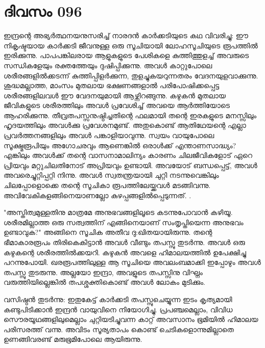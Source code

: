  
\section{ദിവസം 096}


ഇന്ദ്രന്റെ അഭ്യര്‍ത്ഥനയനുസരിച്ച്‌ നാരദന്‍ കാര്‍ക്കടിയുടെ കഥ വിവരിച്ചു: ഈ നികൃഷ്ടയായ കാര്‍ക്കടി ജീവനുള്ള ഒരു സൂചിയായി ലോഹസൂചിയുടെ രൂപത്തില്‍ ഇരിക്കുന്നു. പാപപങ്കിലരായ ആളുകളുടെ പേശികളെ കുത്തിത്തുളച്ച്‌ അവരുടെ സന്ധികളേയും രക്തത്തേയും ദുഷിപ്പിക്കുന്നു. അവള്‍ കാറ്റുപോലെ ശരീരങ്ങളില്‍ക്കടന്ന് കുത്തിപ്പിളര്‍ക്കുന്ന, തുളച്ചുകയറുന്നതരം വേദനയുളവാക്കുന്നു. ശുദ്ധമല്ലാത്ത, മാംസം മുതലായ ഭക്ഷണങ്ങളാല്‍ പരിപോഷിക്കപ്പെട്ട ശരീരങ്ങളിലവള്‍ ഈ വേദനയുമായി ആഴ്ന്നിറങ്ങുന്നു. കഴുകന്‍ മുതലായ ജീവികളുടെ ശരീരത്തിലും അവള്‍ പ്രവേശിച്ച്‌ അവയെ ആര്‍ത്തിയോടെ ആഹരിക്കുന്നു. തീവ്രതപസ്സനുഷ്ഠിച്ചതിന്റെ ഫലമായി തന്റെ ഇരകളുടെ മനസ്സിലും ഹൃദയത്തിലും അവള്‍ക്കു പ്രവേശനമുണ്ട്‌. അതുകൊണ്ട്‌ ആതിഥേയന്റെ എല്ലാ പ്രവര്‍ത്തനങ്ങളിലും അവള്‍ പങ്കാളിയാവുന്നു. സ്വയം വായുപോലെ സൂക്ഷ്മരൂപിയും അഗോചരവും ആണെങ്കില്‍ ഒരാള്‍ക്ക്‌ എന്താണസാദ്ധ്യം? എങ്കിലും അവള്‍ക്ക്‌ തന്റെ വാസനാമാലിന്യം കാരണം ചിലജീവികളോട്‌ ഏറെ പ്രിയവും മറ്റുചിലതിനോട്‌ അപ്രിയവും ഉണ്ടായി. അവയോട്‌ ബന്ധപ്പെട്ട്‌, അവള്‍ അവരെച്ചുറ്റിപ്പറ്റി നിന്നു. അവള്‍ സ്വതന്ത്രയായി ചുറ്റി നടന്നുവെങ്കിലും ചിലപ്പോളൊക്കെ തന്റെ സൂചികാ രൂപത്തിലേയ്ക്കവള്‍ മടങ്ങിവന്നു. അവിവേകികളങ്ങിനെയാണല്ലോ കുഴപ്പങ്ങളില്‍പ്പെടുന്നത്‌. .

"അസ്തിത്വമുള്ളതിനു മാത്രമേ അനുഭവങ്ങളിലൂടെ കടന്നുപോവാന്‍ കഴിയൂ. ശരീരമില്ലാത്ത ഒരു സത്വത്തിന്‌ എങ്ങിനെയാണ്‌ സംതൃപ്തിയെന്ന അനുഭവം ഉണ്ടാവുക?" അങ്ങിനെ സൂചിക അതീവ ദു:ഖിതയായിരുന്നു. തന്റെ ഭീമാകാരരൂപം തിരികെകിട്ടാന്‍ അവള്‍ വീണ്ടും തപസ്സു തുടര്‍ന്നു. അവള്‍ ഒരു കഴുകന്റെ ശരീരത്തില്‍ക്കയറി. കഴുകന്‍ അവളെ ഹിമാലയത്തില്‍ ഉപേക്ഷിച്ചു പറന്നുപോയി. ഖരരൂപത്തിലുള്ള ആ സൂചിയെ അവലംബമാക്കി ഇപ്പോഴും അവള്‍  തപസ്സു തുടരുന്നു. അല്ലയോ ഇന്ദ്രാ, അവളുടെ തപസ്സിനു വിഘ്നം വരുത്തിയില്ലെങ്കില്‍ തപശ്ശക്തികൊണ്ട്‌ അവള്‍ ലോകം മുടിക്കും. 

വസിഷ്ഠന്‍ തുടര്‍ന്നു: ഇതുകേട്ട്‌ കാര്‍ക്കടി തപസ്സുചെയ്യുന്ന ഇടം കൃത്യമായി കണ്ടുപിടിക്കാന്‍ ഇന്ദ്രന്‍ വായുവിനെ നിയോഗിച്ചു. പ്രപഞ്ചമെല്ലാം, വിവിധ സൌരയൂഥങ്ങളിലുമെല്ലാം ചുറ്റിയടിച്ചുവന്ന കാറ്റ്‌ അവസാനം ഭൂമിയില്‍ ഹിമാലയ പരിസരത്ത്‌ വന്നു. അവിടം സൂര്യതാപം കൊണ്ട്‌ ചെടികളൊന്നുമില്ലാതെ ഉണങ്ങിവരണ്ട്‌ മരുഭൂമിപോലെ ആയിരുന്നു.

